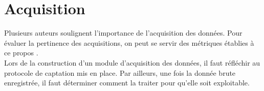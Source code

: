 \section{Acquisition}

Plusieurs auteurs soulignent l'importance de l'acquisition des données. Pour évaluer la pertinence des acquisitions, on peut se servir des métriques établies à ce propos \cite{giotWeb}.\\

Lors de la construction d'un module d'acquisition des données, il faut réfléchir au protocole de captation mis en place. Par ailleurs, une fois la donnée brute enregistrée, il faut déterminer comment la traiter pour qu'elle soit exploitable.



